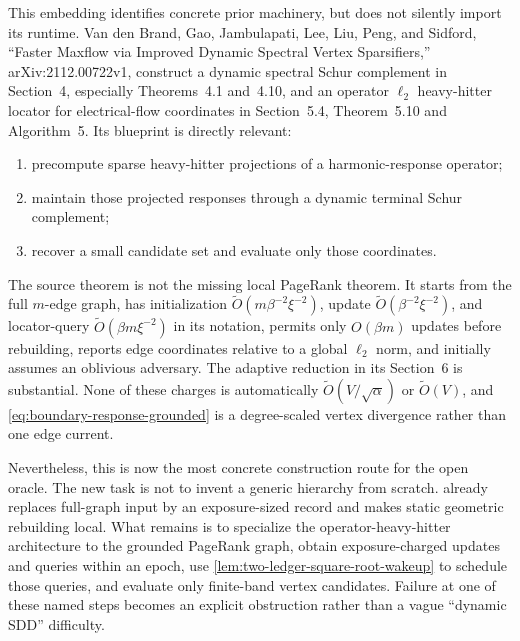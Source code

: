 This embedding identifies concrete prior machinery, but does not silently
import its runtime.  Van den Brand, Gao, Jambulapati, Lee, Liu, Peng, and Sidford,
``Faster Maxflow via Improved Dynamic Spectral Vertex Sparsifiers,''
arXiv:2112.00722v1, construct a dynamic spectral Schur complement in
Section~4, especially Theorems~4.1 and~4.10, and an operator $\ell_2$
heavy-hitter locator for electrical-flow coordinates in Section~5.4,
Theorem~5.10 and Algorithm~5.  Its blueprint is directly relevant:

\begin{enumerate}
\item precompute sparse heavy-hitter projections of a harmonic-response
      operator;
\item maintain those projected responses through a dynamic terminal Schur
      complement;
\item recover a small candidate set and evaluate only those coordinates.
\end{enumerate}

The source theorem is not the missing local PageRank theorem.  It starts from
the full $m$-edge graph, has initialization
$\widetilde O(m\beta^{-2}\xi^{-2})$, update
$\widetilde O(\beta^{-2}\xi^{-2})$, and locator-query
$\widetilde O(\beta m\xi^{-2})$ in its notation, permits only
$O(\beta m)$ updates before rebuilding, reports edge coordinates relative to
a global $\ell_2$ norm, and initially assumes an oblivious adversary.  The
adaptive reduction in its Section~6 is substantial.  None of these charges is
automatically $\widetilde O(V/\sqrt\alpha)$ or
$\widetilde O(V)$, and \cref{eq:boundary-response-grounded} is a
degree-scaled vertex divergence rather than one edge current.

Nevertheless, this is now the most concrete construction route for the open
oracle.  The new task is not to invent a generic hierarchy from scratch.
 already replaces full-graph input by
an exposure-sized record and makes static geometric rebuilding local.  What
remains is to specialize the operator-heavy-hitter architecture to the
grounded PageRank graph, obtain exposure-charged updates and queries within an
epoch, use \cref{lem:two-ledger-square-root-wakeup} to schedule those queries,
and evaluate only finite-band vertex candidates.  Failure at one of these
named steps becomes an explicit obstruction rather than a vague ``dynamic
SDD'' difficulty.

